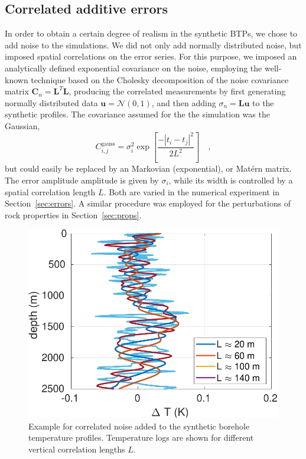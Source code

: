 \documentclass[cp]{copernicus}
\begin{document}
\subsection{Correlated additive errors}
In order to obtain a certain degree of realism in the synthetic BTPs, we chose to add noise to the 
simulations. We did not only add normally distributed noise, but imposed spatial correlations on 
the error series. For this purpose, we imposed an analytically defined exponential covariance on the 
noise, employing the well-known technique based on the Cholesky decomposition of the noise 
covariance matrix $\mathbf{C}_{n}=\mathbf{L}^T\mathbf{L}$, producing the correlated measurements 
by first generating normally distributed data $\mathbf{u}=\mathcal{N}(0,1)$, and then adding 
$\sigma_n = \mathbf{L}\mathbf{u}$ to the synthetic profiles. The covariance assumed for the  the 
simulation was the Gaussian, 
\begin{equation}\label{eqn:covg}
C_{i,j}^{{\text{gauss}}} = \sigma _i^2\exp \left[ {\frac{{ - {{\left| {{t_i} - 
{t_j}} \right|}^2}}}{{2{L^2}}}} \right] \quad , 
\end{equation}  
\noindent but could easily be replaced by an Markovian (exponential), or Mat\'ern matrix. The error 
amplitude amplitude is given by $\sigma_i$, while its width is controlled by a spatial
correlation length $L$. Both are varied in the numerical experiment in Section~\ref{sec:errors}. A 
similar procedure was employed for the perturbations of rock properties in Section~\ref{sec:props}.


\begin{figure}%
 \centering
 \includegraphics[width=0.95\columnwidth]{Figures/Figure_NoiseCorr}
 \caption{Example for correlated noise added to the synthetic borehole temperature profiles. 
Temperature logs are shown for different vertical correlation lengths $L$.}
\label{fig:Noise}
\end{figure}
\end{document}
